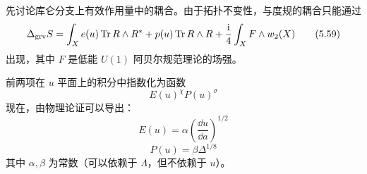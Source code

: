 先讨论库仑分支上有效作用量中的耦合。由于拓扑不变性，与度规的耦合只能通过
\begin{equation}
\Delta_{\text{grv}}S=\int_{X}e(u)\operatorname{Tr} R\wedge R^{*}+p(u)\operatorname{Tr} R\wedge R
+\frac{\mathrm{i}}{4}\int_{X}F\wedge w_{2}(X)
\tag{5.59}
\end{equation}
出现，其中 $F$ 是低能 $U(1)$ 阿贝尔规范理论的场强。

前两项在 $u$ 平面上的积分中指数化为函数
\begin{equation}
E(u)^{\chi}P(u)^{\sigma}
\tag{5.60}
\end{equation}
现在，由物理论证可以导出：
\begin{equation}
E(u)=\alpha\left(\frac{\dd u}{\dd a}\right)^{1/2}
\tag{5.61}
\end{equation}
\begin{equation}
P(u)=\beta\Delta^{1/8}
\tag{5.62}
\end{equation}
其中 $\alpha,\beta$ 为常数（可以依赖于 $\Lambda$，但不依赖于 $u$）。


